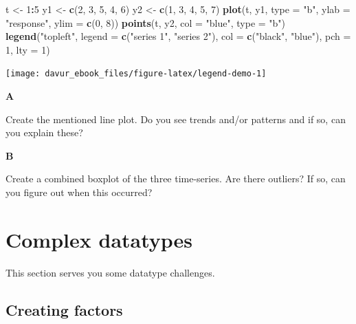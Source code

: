\documentclass[]{book}
\newenvironment{Shaded}{\begin{snugshade}}{\end{snugshade}}
\newcommand{\DataTypeTok}[1]{\textcolor[rgb]{0.13,0.29,0.53}{#1}}
\newcommand{\DecValTok}[1]{\textcolor[rgb]{0.00,0.00,0.81}{#1}}
\newcommand{\KeywordTok}[1]{\textcolor[rgb]{0.13,0.29,0.53}{\textbf{#1}}}
\newcommand{\NormalTok}[1]{#1}
\newcommand{\OperatorTok}[1]{\textcolor[rgb]{0.81,0.36,0.00}{\textbf{#1}}}
\newcommand{\StringTok}[1]{\textcolor[rgb]{0.31,0.60,0.02}{#1}}
\begin{document}
\begin{Shaded}
\begin{Highlighting}[]
\NormalTok{t <-}\StringTok{ }\DecValTok{1}\OperatorTok{:}\DecValTok{5}
\NormalTok{y1 <-}\StringTok{ }\KeywordTok{c}\NormalTok{(}\DecValTok{2}\NormalTok{, }\DecValTok{3}\NormalTok{, }\DecValTok{5}\NormalTok{, }\DecValTok{4}\NormalTok{, }\DecValTok{6}\NormalTok{)}
\NormalTok{y2 <-}\StringTok{ }\KeywordTok{c}\NormalTok{(}\DecValTok{1}\NormalTok{, }\DecValTok{3}\NormalTok{, }\DecValTok{4}\NormalTok{, }\DecValTok{5}\NormalTok{, }\DecValTok{7}\NormalTok{)}
\KeywordTok{plot}\NormalTok{(t, y1, }\DataTypeTok{type =} \StringTok{"b"}\NormalTok{, }\DataTypeTok{ylab =} \StringTok{"response"}\NormalTok{, }\DataTypeTok{ylim =} \KeywordTok{c}\NormalTok{(}\DecValTok{0}\NormalTok{, }\DecValTok{8}\NormalTok{))}
\KeywordTok{points}\NormalTok{(t, y2, }\DataTypeTok{col =} \StringTok{"blue"}\NormalTok{, }\DataTypeTok{type =} \StringTok{"b"}\NormalTok{)}
\KeywordTok{legend}\NormalTok{(}\StringTok{"topleft"}\NormalTok{, }\DataTypeTok{legend =} \KeywordTok{c}\NormalTok{(}\StringTok{"series 1"}\NormalTok{, }\StringTok{"series 2"}\NormalTok{), }\DataTypeTok{col =} \KeywordTok{c}\NormalTok{(}\StringTok{"black"}\NormalTok{, }\StringTok{"blue"}\NormalTok{), }\DataTypeTok{pch =} \DecValTok{1}\NormalTok{, }\DataTypeTok{lty =} \DecValTok{1}\NormalTok{)}
\end{Highlighting}
\end{Shaded}

\begin{center}\texttt{[image: davur\_ebook\_files/figure-latex/legend-demo-1]} \end{center}

\textbf{A}

Create the mentioned line plot. Do you see trends and/or patterns and if so, can you explain these?

\textbf{B}

Create a combined boxplot of the three time-series. Are there outliers? If so, can you figure out when this occurred?

\hypertarget{complex-datatypes-1}{%
\section{Complex datatypes}\label{complex-datatypes-1}}

This section serves you some datatype challenges.

\hypertarget{creating-factors}{%
\subsection{Creating factors}\label{creating-factors}}
\end{document}
